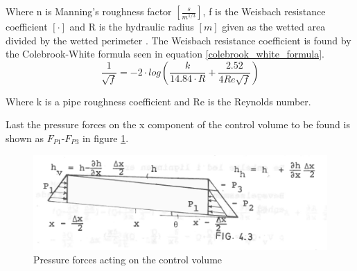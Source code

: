 Where n is Manning's roughness factor $[ \frac{s}{m^{1/3}} ]$, f is the Weisbach resistance coefficient $[\cdot]$ and R is the hydraulic radius $[m]$ given as the wetted area divided by the wetted perimeter \cite{stormwatercollectionsystems}.
The Weisbach resistance coefficient is found by the Colebrook-White formula seen in equation \ref{colebrook_white_formula}.
\begin{equation}
\frac{1}{\sqrt{f}} = -2\cdot log \left( \frac{k}{14.84 \cdot R}+ \frac{2.52}{4 Re \sqrt{f}} \right)
\label{colebrook_white_formula}
\end{equation}

Where k is a pipe roughness coefficient and Re is the Reynolds number.

Last the pressure forces on the x component of the control volume to be found is shown as $F_{P1}$-$F_{P3}$ in figure \ref{fig:forces_on_CV}. 

\begin{figure}[H]
\centering
\includegraphics[width=1\textwidth]{report/modeling/pictures/palle_fig}
\caption{Pressure forces acting on the control volume }
\label{fig:forces_on_CV}
\end{figure}

